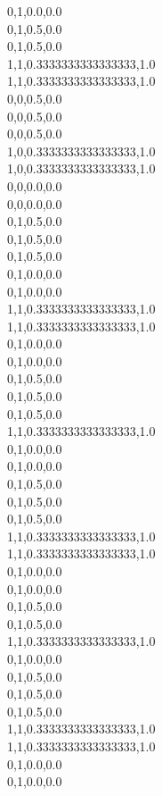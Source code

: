 0,1,0.0,0.0\\
0,1,0.5,0.0\\
0,1,0.5,0.0\\
1,1,0.3333333333333333,1.0\\
1,1,0.3333333333333333,1.0\\
0,0,0.5,0.0\\
0,0,0.5,0.0\\
0,0,0.5,0.0\\
1,0,0.3333333333333333,1.0\\
1,0,0.3333333333333333,1.0\\
0,0,0.0,0.0\\
0,0,0.0,0.0\\
0,1,0.5,0.0\\
0,1,0.5,0.0\\
0,1,0.5,0.0\\
0,1,0.0,0.0\\
0,1,0.0,0.0\\
1,1,0.3333333333333333,1.0\\
1,1,0.3333333333333333,1.0\\
0,1,0.0,0.0\\
0,1,0.0,0.0\\
0,1,0.5,0.0\\
0,1,0.5,0.0\\
0,1,0.5,0.0\\
1,1,0.3333333333333333,1.0\\
0,1,0.0,0.0\\
0,1,0.0,0.0\\
0,1,0.5,0.0\\
0,1,0.5,0.0\\
0,1,0.5,0.0\\
1,1,0.3333333333333333,1.0\\
1,1,0.3333333333333333,1.0\\
0,1,0.0,0.0\\
0,1,0.0,0.0\\
0,1,0.5,0.0\\
0,1,0.5,0.0\\
1,1,0.3333333333333333,1.0\\
0,1,0.0,0.0\\
0,1,0.5,0.0\\
0,1,0.5,0.0\\
0,1,0.5,0.0\\
1,1,0.3333333333333333,1.0\\
1,1,0.3333333333333333,1.0\\
0,1,0.0,0.0\\
0,1,0.0,0.0\\
